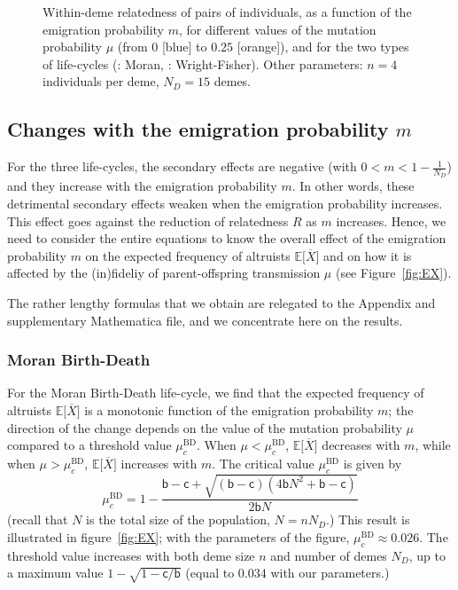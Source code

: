\documentclass[11pt, letterpaper]{article}
\newcommand{\Esp}[1]{\mathbb{E}\big[ #1\big]}%
\newcommand{\appname}[0]{Appendix}
\newcommand{\bb}{\mathsf{b}}
\newcommand{\cc}{\mathsf{c}}
\newcommand{\BD}{\textrm{BD}}
\newcommand{\ndemes}{N_D}
\begin{document}
\begin{figure}[h]
\begin{tabular}{cc}
\end{tabular}
\caption{Within-deme relatedness of pairs of individuals, as a function of the emigration probability $m$, for different values of the mutation probability $\mu$ (from $0$ [blue] to $0.25$ [orange]), and for the two types of life-cycles (: Moran, : Wright-Fisher). Other parameters: $n=4$ individuals per deme, $\ndemes = 15$ demes.}
\label{fig:R}
\end{figure}

\subsection{Changes with the emigration probability $m$} 

For the three life-cycles, the secondary effects are negative (with $0<m< 1- \frac{1}{\ndemes}$) and they increase with the emigration probability $m$. In other words, these detrimental secondary effects weaken when the emigration probability increases. This effect goes against the reduction of relatedness $R$ as $m$ increases. Hence, we need to consider the entire equations to know the overall effect of the emigration probability $m$ on the expected frequency of altruists $\Esp{\overline{X}}$ and on how it is affected by the (in)fideliy of parent-offspring transmission $\mu$ (see Figure~\ref{fig:EX}). 
 
The rather lengthy formulas that we obtain are relegated to the \appname{} and supplementary Mathematica file, and we concentrate here on the results. 

\subsubsection{Moran Birth-Death}

For the Moran Birth-Death life-cycle, we find that the expected frequency of altruists $\Esp{\overline{X}}$ is a monotonic function of the emigration probability $m$; the direction of the change depends on the value of the mutation probability $\mu$ compared to a threshold value $\mu_c^{\BD}$. When $\mu<\mu_c^{\BD}$, $\Esp{\overline{X}}$ decreases with $m$, while when $\mu>\mu_c^{\BD}$, $\Esp{\overline{X}}$  increases with $m$. The critical value $\mu_c^{\BD}$ is given by 
\begin{equation}\label{eq:mucBD}
\mu_c^{\BD} = %
1 - \frac{\bb  - \cc + \sqrt{(\bb - \cc) \left(4 \bb N^2 + \bb - \cc \right)} }{2 \bb N}
\end{equation}
%
(recall that $N$ is the total size of the population, $N=n \ndemes$.) This result is illustrated in figure~\ref{fig:EX}; with the parameters of the figure, $\mu_c^{\BD} \approx 0.026$. The threshold value increases with both deme size $n$ and number of demes $\ndemes$, up to a maximum value $1 - \sqrt{1-\cc/\bb}$ (equal to $0.034$ with our parameters.)
\end{document}
